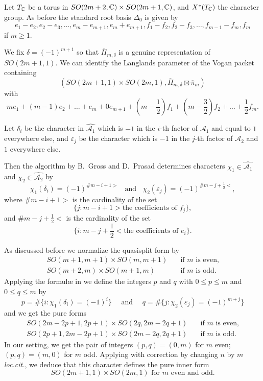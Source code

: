 \medskip
Let $T_{\mathbb C}$ be a torus in $SO(2m+2,{\mathbb C})  \times SO(2m+1,{\mathbb C})$,
 and $X^{\ast}(T_{\mathbb C})$ the character group. 
As before the standard root basis $\Delta_0$ is given by
\[
e_1-e_2, e_2-e_3,\dots,{{e_{m}-e_{m+1},e_{m}+e_{m+1}}}, f_1-f_2 ,f_2-f_3, \dots, f_{m-1}-f_m,f_m
\]
{if $m \ge 1$}.

We fix $\delta=(-1)^{m+1}$
 so that $\overline{\Pi}_{m,\delta}$ is a genuine representation
 of $SO(2m+1,1)$.  
We can identify the Langlands parameter of the Vogan packet containing 
\[
(SO(2m+1,1)\times SO(2m,1),\overline{ \Pi}_{m, {{\delta}}} \boxtimes \overline{ \pi}_m)
\]
with 
 \[ me_1+(m-1)e_2+ \dots +e_m+0e_{m+1} +(m-\frac 1 2 )f_1+(m- \frac 3 2 ) f_2 +\dots + \frac 1 2 f_m.\]
 


Let $\delta_i$ be the character in $ \widehat{{\mathcal{A}}_1}$ which is $-1$ in the $i$-th factor
 of ${\mathcal{A}}_1$
 and equal to $1$ everywhere else, 
 and $\varepsilon_j$ be the character  which is $-1$
 in the $j$-th factor of ${\mathcal{A}}_2$ and $1$ everywhere else.  



Then the algorithm by B.~Gross and D.~Prasad 
\cite[p.~993]{GP} determines characters
 $\chi_1 \in \widehat {{\mathcal{A}}_1}$
 and $\chi_2 \in \widehat {{\mathcal{A}}_2}$
 by 
\[
 \chi_1(\delta_i)= (-1)^{\#m-i+1>}  \ \ \ \ 
 \mbox{and}  \ \ \ \  
 \chi_2(\varepsilon_j)=  (-1)^{\#m-j + \frac 1 2<}, 
\]
where $\#m-i+1>$ is the cardinality
 of the set 
\[
\{j: m-i+1> \text{the coefficients of $f_j$}\},
\]
 and $\# m-j+\frac 1 2 <$ is the cardinality
 of the set 
\[
\{i:m-j+\frac 1 2 < \text{the coefficients of $e_i$}\}.  
\]



As discussed before we normalize the quasisplit form by 
\begin{align*}
 SO(m+1,m+1) \times SO(m,m+1) \quad &\mbox{if $m$ is even,} 
\\
 SO(m+2,m) \times SO(m+1, m)  \quad &\mbox{if $m$ is odd.} 
\end{align*}
Applying the formul{\ae} in \cite[(12.21)]{GP}
 we define the integers $p$ and $q$
 with $0 \leq p \leq m $ and $0 \leq q \leq m$
by
\[
 p  =  \# \{ i : \chi_1(    \delta_i  )  = (-1)^i  \}  \quad \mbox{ and }  
\quad  q  =  \# \{ j:  \chi_2(   \varepsilon_j     )  = (-1)^{m+j}  \}
\]
and we get the pure forms
\begin{align}
SO(2m-2p+1, 2p+1) \times SO(2q ,2m-2q+1) \quad &\mbox{if $m$ is even,}
\\
SO(2p+1,2m-2p+1) \times SO(2m-2q, 2q+1) \quad &\mbox{if $m$ is odd.}
\end{align}
In our setting,  we get the pair of integers $(p,q)=(0,m)$ for $m$ even; $(p,q)=(m,0)$ for $m$ odd.
Applying \cite[(12.22)]{GP}
 with correction by changing $n$ by $m$ 
 {\it{loc.cit.}}, 
 we deduce that this character defines the pure inner form 
\[
 \text{$SO(2m+1,1) \times SO(2m,1)$ for $m$ even and odd.}
\]  

